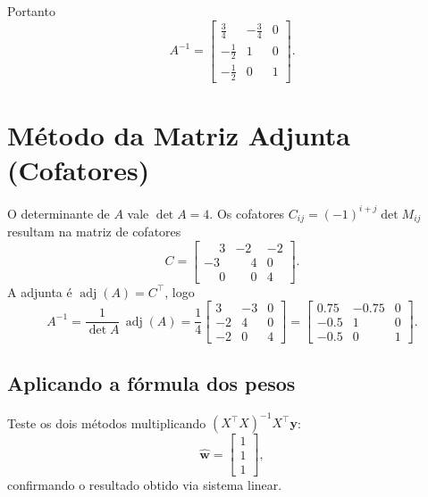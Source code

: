 \documentclass[12pt]{article}
\begin{document}
Portanto
\[
A^{-1} =
\begin{bmatrix}
\tfrac34 & -\tfrac34 & 0\\[4pt]
-\tfrac12 & 1 & 0\\[4pt]
-\tfrac12 & 0 & 1
\end{bmatrix}.
\]

\section{Método da Matriz Adjunta (Cofatores)}
O determinante de $A$ vale $\det A = 4$.  Os cofatores $C_{ij}=(-1)^{i+j}\det M_{ij}$ resultam na matriz de cofatores
\[
C =
\begin{bmatrix}
\phantom{-}3 & -2 & -2\\
-3 & \phantom{-}4 &  0\\
\phantom{-}0 & \phantom{-}0 &  4
\end{bmatrix}.
\]
A adjunta é $\operatorname{adj}(A)=C^{\!\top}$, logo
\[
A^{-1}=\frac{1}{\det A}\,\operatorname{adj}(A)=\frac14
\begin{bmatrix}
3 & -3 & 0\\
-2 & 4 & 0\\
-2 & 0 & 4
\end{bmatrix}
=
\begin{bmatrix}
0.75 & -0.75 & 0\\
-0.5 & 1 & 0\\
-0.5 & 0 & 1
\end{bmatrix}.
\]

\subsection*{Aplicando a fórmula dos pesos}
Teste os dois métodos multiplicando $(X^{\!\top}X)^{-1}X^{\!\top}\bm{y}$:\[
\hat{\bm w} =
\begin{bmatrix}
1\\1\\1
\end{bmatrix},
\]confirmando o resultado obtido via sistema linear.
\end{document}
